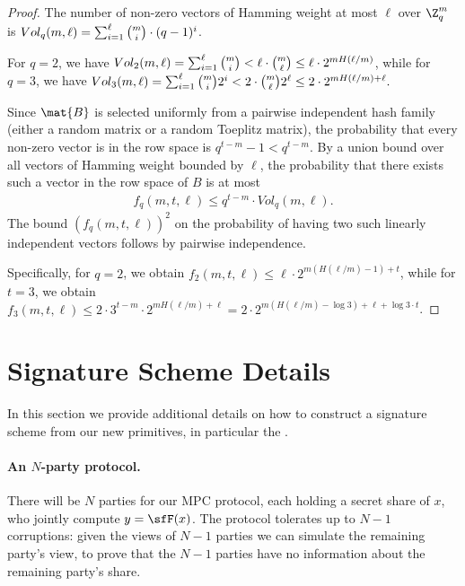\begin{proof}The number of non-zero vectors of Hamming weight at most $\ell$ over $\Z_q^m$ is
$Vol_q(m,\ell) = \sum_{i=1}^\ell \tbinom{m}{i} \cdot (q-1)^{i}$.

For $q = 2$, we have
$Vol_2(m,\ell) = \sum_{i=1}^\ell \tbinom{m}{i} <
\ell \cdot \tbinom{m}{\ell} \leq
\ell \cdot 2^{m H(\ell/m)}$, while for $q = 3$, we have
$Vol_3(m,\ell) = \sum_{i=1}^\ell \tbinom{m}{i} 2^i <
2 \cdot \tbinom{m}{\ell} 2^\ell \leq
2 \cdot 2^{m H(\ell/m) + \ell}.$

Since $\mat{B}$ is selected uniformly from a pairwise independent hash family (either a random matrix or a random Toeplitz matrix),
the probability that every non-zero vector is in the row space is $q^{t-m} - 1 < q^{t-m}$. By a union bound over all vectors of Hamming weight bounded by $\ell$, the probability that there exists such a vector in the row space of $B$ is at most
\begin{align*}
f_q(m,t,\ell) \leq q^{t-m} \cdot Vol_q(m,\ell).
\end{align*}
The bound $(f_q(m,t,\ell))^2$ on the probability of having two such linearly independent vectors follows by pairwise independence.

Specifically, for $q = 2$, we obtain
$f_2(m,t,\ell) \leq \ell \cdot 2^{m (H(\ell/m) - 1) + t}$,
while for $t = 3$, we obtain
$f_3(m,t,\ell) \leq 2 \cdot 3^{t-m} \cdot 2^{m H(\ell/m) + \ell} = 2 \cdot 2^{m (H(\ell/m) - \log 3) + \ell + \log 3 \cdot t}$.
\end{proof}



\iffull\else

\fi






\section{Signature Scheme Details}
\label{appendix:picnic}
In this section we provide additional details on how to construct a signature scheme from our
new primitives, in particular the \ttOWF.


\paragraph{An $N$-party protocol.}
There will be $N$ parties for our MPC protocol, each holding a secret share of
$x$, who jointly compute $y = \sfF(x)$.  The protocol tolerates up to  $N-1$
corruptions: given the views of $N-1$ parties we can simulate the remaining
party's view, to prove that the $N-1$ parties have no information about the
remaining party's share.

